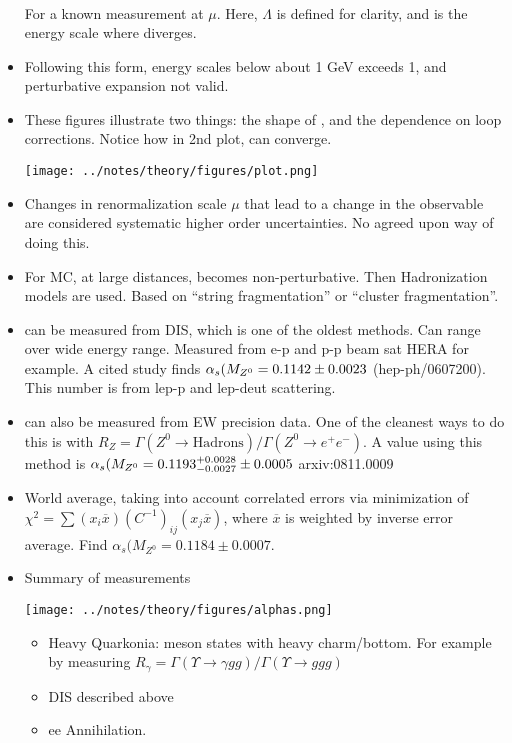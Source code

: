 \begin{itemize}
\begin{equation}
\begin{split}
    \end{split}\end{equation}
    For a known measurement at $\mu$. Here, $\Lambda$ is defined for clarity, and is the energy scale where \as diverges.
    \item Following this form, energy scales below about 1 GeV \as exceeds 1, and perturbative expansion not valid. \cite{bethke}
    \item These figures illustrate two things: the shape of \as, and the dependence on loop corrections. Notice how in 2nd plot, \as can converge. \\ \cite{bethke}
    \begin{center}
    \texttt{[image: ../notes/theory/figures/plot.png]}
    \end{center}
    \item Changes in renormalization scale $\mu$ that lead to a change in the observable are considered systematic higher order uncertainties. No agreed upon way of doing this. \cite{bethke}
    \item For MC, at large distances, becomes non-perturbative. Then Hadronization models are used. Based on ``string fragmentation'' or ``cluster fragmentation''.  \cite{bethke}
    \item \as can be measured from DIS, which is one of the oldest methods. Can range over wide energy range. Measured from e-p and p-p beam sat HERA for example. A cited study finds $\alpha_s(M_{Z^0}=0.1142\pm0.0023$ (hep-ph/0607200). This number is from lep-p and lep-deut scattering. \cite{bethke}
    \item \as can also be measured from EW precision data. One of the cleanest ways to do this is with $R_Z=\Gamma(Z^0\to\text{Hadrons})/\Gamma(Z^0\to e^+e^-)$. A value using this method is $\alpha_s(M_{Z^0}=0.1193^{+0.0028}_{-0.0027}\pm0.0005$ arxiv:0811.0009 \cite{bethke}
    \item World average, taking into account correlated errors via minimization of $\chi^2=\sum(x_i\overline{x})(C^{-1})_{ij}(x_j\overline{x})$, where $\overline{x}$ is weighted by inverse error average. Find $\alpha_s(M_{Z^0}=0.1184\pm0.0007$. \cite{bethke}
    \item Summary of measurements \cite{bethke}
    \begin{center}
    \texttt{[image: ../notes/theory/figures/alphas.png]}
    \end{center}
    \begin{itemize}
        \item Heavy Quarkonia: meson states with heavy charm/bottom. For example by measuring $R_\gamma=\Gamma(\Upsilon\to\gamma gg)/\Gamma(\Upsilon\to ggg)$ \cite{bethke}
        \item DIS described above \cite{bethke}
        \item ee Annihilation. \cite{bethke}
    \end{itemize}

\end{itemize}

